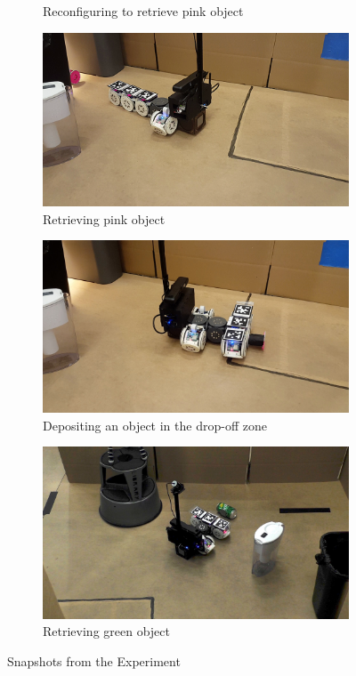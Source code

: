 \documentclass[conference]{IEEEtran}
\begin{document}
\begin{figure}[t]
\begin{subfigure}[t]{0.32\textwidth}
        \caption{Reconfiguring to retrieve pink object}
    \end{subfigure}
    \begin{subfigure}[t]{0.32\textwidth}
        \includegraphics[width=\textwidth]{images/pink_retrieval.png}
        \caption{Retrieving pink object}
        \label{fig:pink_grab}
    \end{subfigure}
    \begin{subfigure}[t]{0.32\textwidth}
        \includegraphics[width=\textwidth]{images/dropoff.jpg}
        \caption{Depositing an object in the drop-off zone}
        \label{fig:dropoff}
    \end{subfigure}
    \begin{subfigure}[t]{0.32\textwidth}
        \includegraphics[width=\textwidth]{images/green_retrieval.jpg}
        \caption{Retrieving green object}
    \end{subfigure}
      \caption{Snapshots from the Experiment}
      \label{fig:demo}
   \vspace{-1em}
   \end{figure}
\end{document}

